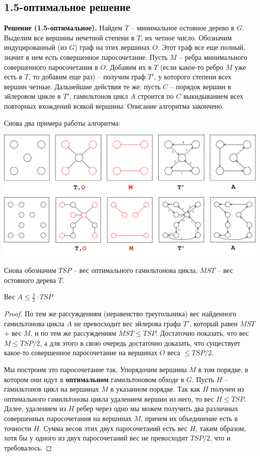 \subsection{1.5-оптимальное решение}

\textbf{Решение (1.5-оптимальное).} Найдем $T$ -- минимальное остовное дерево в $G$. Выделим все вершины нечетной степени в $T$, их четное число. Обозначим индуцированный (из $G$) граф на этих вершинах $O$. Этот граф все еще полный, значит в нем есть совершенное паросочетание. Пусть $M$ -- ребра минимального совершенного паросочетания в $O$. Добавим их в $T$ (если какое-то ребро $M$ уже есть в $T$, то добавим еще раз) -- получим граф $T'$, у которого степени всех вершин четные. Дальнейшие действия те же: пусть $C$ -- порядок вершин в эйлеровом цикле в $T'$, гамильтонов цикл $A$ строится по $C$ выкидыванием всех повторных вхождений всякой вершины. Описание алгоритма закончено.

Снова два примера работы алгоритма:

\includegraphics[width=\textwidth]{figures/ex_shorthamil2.png} \\
\includegraphics[width=\textwidth]{figures/ex_longhamil2.png}

Снова обозначим $TSP$ -- вес оптимального гамильтонова цикла, $MST$ -- вес остовного дерева $T$.

\begin{theorem*} Вес $A \leq \frac{3}{2}\cdot TSP$\end{theorem*}
\begin{proof}
По тем же рассуждениям (неравенство треугольника) вес найденного гамильтонова цикла $A$ не превосходит вес эйлерова графа $T'$, который равен $MST$ $+$ вес $M$, и по тем же рассуждениям $MST \leq TSP$. Достаточно показать, что вес $M \leq TSP/2$, а для этого в свою очередь достаточно доказать, что существует какое-то совершенное паросочетание на вершинах $O$ веса $\leq TSP/2$.

Мы построим это паросочетание так. Упорядочим вершины $M$ в том порядке, в котором они идут в \textbf{оптимальном} гамильтоновом обходе в $G$. Пусть $H$ -- гамильтонов цикл на вершинах $M$ в указанном порядке. Так как $H$ получен из оптимального гамильтонова цикла удалением вершин из него, то вес $H \leq TSP$. Далее, удалением из $H$ ребер через одно мы можем получить два различных совершенных паросочетания на вершинах $M$, причем их объединение есть в точности $H$. Сумма весов этих двух паросочетаний есть вес $H$, таким образом, хотя бы у одного из двух паросочетаний вес не превосходит $TSP/2$, что и требовалось.
\end{proof}
